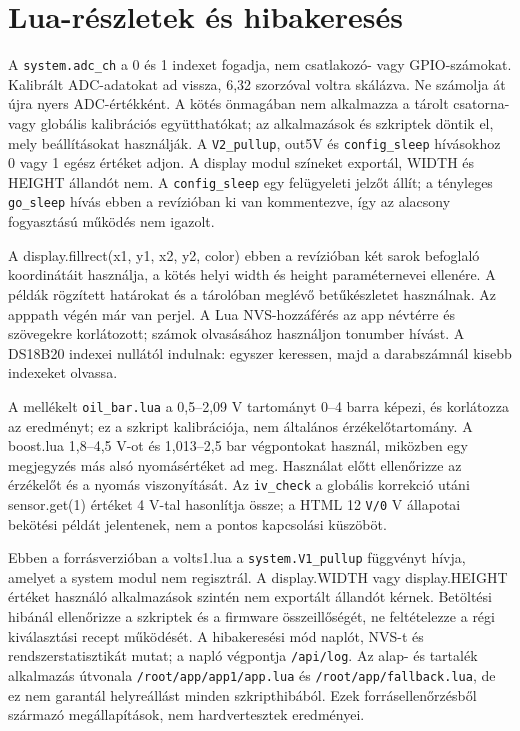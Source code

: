 \section{Lua-részletek és hibakeresés}
A \nolinkurl{system.adc_ch} a 0 és 1 indexet fogadja, nem csatlakozó- vagy GPIO-számokat. Kalibrált ADC-adatokat ad vissza, 6,32 szorzóval voltra skálázva. Ne számolja át újra nyers ADC-értékként. A kötés önmagában nem alkalmazza a tárolt csatorna- vagy globális kalibrációs együtthatókat; az alkalmazások és szkriptek döntik el, mely beállításokat használják. A \nolinkurl{V2_pullup}, out5V és \nolinkurl{config_sleep} hívásokhoz 0 vagy 1 egész értéket adjon. A display modul színeket exportál, WIDTH és HEIGHT állandót nem. A \nolinkurl{config_sleep} egy felügyeleti jelzőt állít; a tényleges \nolinkurl{go_sleep} hívás ebben a revízióban ki van kommentezve, így az alacsony fogyasztású működés nem igazolt.

A display.fillrect(x1, y1, x2, y2, color) ebben a revízióban két sarok befoglaló koordinátáit használja, a kötés helyi width és height paraméternevei ellenére. A példák rögzített határokat és a tárolóban meglévő betűkészletet használnak. Az apppath végén már van perjel. A Lua NVS-hozzáférés az app névtérre és szövegekre korlátozott; számok olvasásához használjon tonumber hívást. A DS18B20 indexei nullától indulnak: egyszer keressen, majd a darabszámnál kisebb indexeket olvassa.

A mellékelt \nolinkurl{oil_bar.lua} a 0,5–2,09 V tartományt 0–4 barra képezi, és korlátozza az eredményt; ez a szkript kalibrációja, nem általános érzékelőtartomány. A boost.lua 1,8–4,5 V-ot és 1,013–2,5 bar végpontokat használ, miközben egy megjegyzés más alsó nyomásértéket ad meg. Használat előtt ellenőrizze az érzékelőt és a nyomás viszonyítását. Az \nolinkurl{iv_check} a globális korrekció utáni sensor.get(1) értéket 4 V-tal hasonlítja össze; a HTML 12 \nolinkurl{V/0} V állapotai bekötési példát jelentenek, nem a pontos kapcsolási küszöböt.

Ebben a forrásverzióban a volts1.lua a \nolinkurl{system.V1_pullup} függvényt hívja, amelyet a system modul nem regisztrál. A display.WIDTH vagy display.HEIGHT értéket használó alkalmazások szintén nem exportált állandót kérnek. Betöltési hibánál ellenőrizze a szkriptek és a firmware összeillőségét, ne feltételezze a régi kiválasztási recept működését. A hibakeresési mód naplót, NVS-t és rendszerstatisztikát mutat; a napló végpontja \nolinkurl{/api/log}. Az alap- és tartalék alkalmazás útvonala \nolinkurl{/root/app/app1/app.lua} és \nolinkurl{/root/app/fallback.lua}, de ez nem garantál helyreállást minden szkripthibából. Ezek forrásellenőrzésből származó megállapítások, nem hardvertesztek eredményei.

